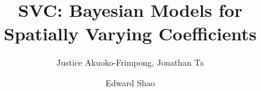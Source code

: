 



\addtolength{\oddsidemargin}{-.5in}%
\addtolength{\evensidemargin}{-1in}%
\addtolength{\textwidth}{1in}%
\addtolength{\textheight}{1.7in}%
\addtolength{\topmargin}{-1in}%



\def\spacingset#1{\renewcommand{\baselinestretch}%
{#1}\small\normalsize} \spacingset{1}

\date{}

\newcommand{\footremember}[2]{%
    \footnote{#2}
    \newcounter{#1}
    \setcounter{#1}{\value{footnote}}%
}
\newcommand{\footrecall}[1]{%
    \footnotemark[\value{#1}]%
} 

\newcommand{\bbR}{\mathbb{R}}
\newcommand{\bX}{\boldsymbol{X}}
\newcommand{\bs}{\boldsymbol{s}}
\newcommand{\Ytilde}{\tilde{Y}}

\newcommand{\mytitle}{SVC: Bayesian Models for Spatially Varying Coefficients}  

\title{\bf \mytitle}
\author{Justice Akuoko-Frimpong, Jonathan Ta \and Edward Shao}

\maketitle


\spacingset{1.9} %


